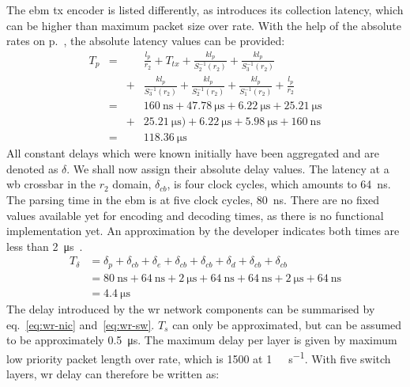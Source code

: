 The \gls{ebm} \gls{tx} encoder is listed differently, as introduces its collection latency, which can be higher than maximum packet size over rate.
With the help of the absolute rates on p.~\pageref{eq:rates}, the absolute latency values can be provided:
%
\begin{equation}
\begin{aligned}
T_p &=&&  \frac{l_p}{r_2} + T_{tx} +  \frac{kl_p}{S^{-1}_2(r_2)} +  \frac{kl_p}{S^{-1}_3(r_2)}\\[8pt]
       &&+&   \frac{kl_p}{S^{-1}_3(r_2)} +  \frac{kl_p}{S^{-1}_2(r_2)} + \frac{kl_p}{S^{-1}_1(r_2)} +\frac{l_p}{r_2} \\[8pt]
&=&& \SI{160}{\nano\second} + \SI{47.78}{\micro\second}  +  \SI{6.22}{\micro\second} +  \SI{25.21}{\micro\second} \\[8pt]
&&+&  \SI{25.21}{\micro\second}) + \SI{6.22}{\micro\second} + \SI{5.98}{\micro\second} + \SI{160}{\nano\second} \\[8pt]
&=&&  \SI{118.36}{\micro\second}
\end{aligned}
\end{equation}
%
All constant delays which were known initially have been aggregated and are denoted as $\delta$. We shall now assign their absolute delay values. The latency at a \gls{wb} crossbar in the $r_2$ domain, $\delta_{cb}$,
is four clock cycles, which amounts to \SI{64}{\nano\second}. The parsing time in the \gls{ebm} is at five clock cycles, \SI{80}{\nano\second}. There are no fixed values available yet for
encoding and decoding times, as there is no functional implementation yet. An approximation by the developer indicates both times are less than \SI{2}{\micro\second}~\cite{lipinski_white_2011-1}.
%
\begin{equation}
\begin{aligned}
T_\delta &= \delta_{p} + \delta_{cb} + \delta_{e} + \delta_{cb} + \delta_{cb} +\delta_{d} + \delta_{cb} + \delta_{cb}\\
&= \SI{80}{\nano\second} + \SI{64}{\nano\second} + \SI{2}{\micro\second} + \SI{64}{\nano\second} + \SI{64}{\nano\second} + \SI{2}{\micro\second} + \SI{64}{\nano\second}\\
&= \SI{4.4}{\micro\second}
 \end{aligned}
\end{equation}
%
The delay introduced by the \gls{wr} network components can be summarised by eq.~\ref{eq:wr-nic} and~\ref{eq:wr-sw}. $T_s$ can only be approximated, but can be assumed to be approximately \SI{0.5}{\micro\second}.
The maximum delay per layer is given by maximum low priority packet length over rate, which is \SI{1500}{\byte} at \SI{1}{\giga\bit\per\second}. With five switch layers, \gls{wr} delay can therefore be written as:
